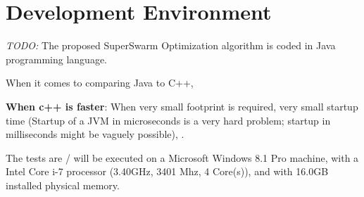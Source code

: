 \section{Development Environment}

\emph{\color{red}TODO:} 
The proposed SuperSwarm Optimization algorithm is coded in Java programming language.  

When it comes to comparing Java to C++, 


\textbf{When c++ is faster}: When very small footprint is required, very small startup time (Startup of a JVM in microseconds is a very hard problem; startup in milliseconds might be vaguely possible), .


The tests are / will be executed on a Microsoft Windows 8.1 Pro machine, with a Intel Core i-7 processor (3.40GHz, 3401 Mhz, 4 Core(s)), and with 16.0GB installed physical memory. 

